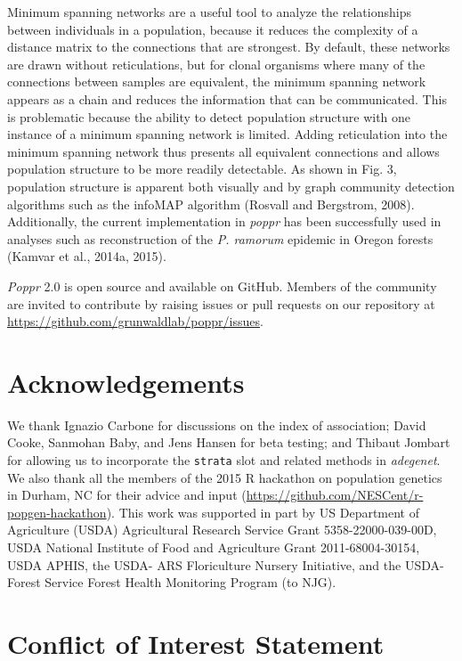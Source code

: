 \documentclass{frontiersSCNS} %
\begin{document}
Minimum spanning networks are a useful tool to analyze the relationships
between individuals in a population, because it reduces the complexity
of a distance matrix to the connections that are strongest. By default,
these networks are drawn without reticulations, but for clonal organisms
where many of the connections between samples are equivalent, the
minimum spanning network appears as a chain and reduces the information
that can be communicated. This is problematic because the ability to
detect population structure with one instance of a minimum spanning
network is limited. Adding reticulation into the minimum spanning
network thus presents all equivalent connections and allows population
structure to be more readily detectable. As shown in Fig. 3, population
structure is apparent both visually and by graph community detection
algorithms such as the infoMAP algorithm (Rosvall and Bergstrom, 2008).
Additionally, the current implementation in \emph{poppr} has been
successfully used in analyses such as reconstruction of the \emph{P.
ramorum} epidemic in Oregon forests (Kamvar et al., 2014a, 2015).

\emph{Poppr} 2.0 is open source and available on GitHub. Members of the
community are invited to contribute by raising issues or pull requests
on our repository at \url{https://github.com/grunwaldlab/poppr/issues}.

\section*{Acknowledgements}\label{acknowledgements}

We thank Ignazio Carbone for discussions on the index of association;
David Cooke, Sanmohan Baby, and Jens Hansen for beta testing; and
Thibaut Jombart for allowing us to incorporate the \texttt{strata} slot
and related methods in \emph{adegenet}. We also thank all the members of
the 2015 R hackathon on population genetics in Durham, NC for their
advice and input (\url{https://github.com/NESCent/r-popgen-hackathon}).
This work was supported in part by US Department of Agriculture (USDA)
Agricultural Research Service Grant 5358-22000-039-00D, USDA National
Institute of Food and Agriculture Grant 2011-68004-30154, USDA APHIS,
the USDA- ARS Floriculture Nursery Initiative, and the USDA-Forest
Service Forest Health Monitoring Program (to NJG).

\section*{Conflict of Interest
Statement}\label{conflict-of-interest-statement}
\end{document}
